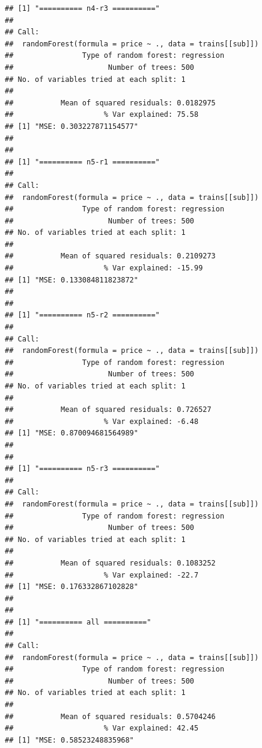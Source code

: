 \documentclass[
]{article}
\newenvironment{Shaded}{\begin{snugshade}}{\end{snugshade}}
\newcommand{\NormalTok}[1]{#1}
\newcommand{\OperatorTok}[1]{\textcolor[rgb]{0.81,0.36,0.00}{\textbf{#1}}}
\newcommand{\StringTok}[1]{\textcolor[rgb]{0.31,0.60,0.02}{#1}}
\begin{document}
\begin{verbatim}
## [1] "========== n4-r3 =========="
## 
## Call:
##  randomForest(formula = price ~ ., data = trains[[sub]]) 
##                Type of random forest: regression
##                      Number of trees: 500
## No. of variables tried at each split: 1
## 
##           Mean of squared residuals: 0.0182975
##                     % Var explained: 75.58
## [1] "MSE: 0.303227871154577"
## 
## 
## [1] "========== n5-r1 =========="
## 
## Call:
##  randomForest(formula = price ~ ., data = trains[[sub]]) 
##                Type of random forest: regression
##                      Number of trees: 500
## No. of variables tried at each split: 1
## 
##           Mean of squared residuals: 0.2109273
##                     % Var explained: -15.99
## [1] "MSE: 0.133084811823872"
## 
## 
## [1] "========== n5-r2 =========="
## 
## Call:
##  randomForest(formula = price ~ ., data = trains[[sub]]) 
##                Type of random forest: regression
##                      Number of trees: 500
## No. of variables tried at each split: 1
## 
##           Mean of squared residuals: 0.726527
##                     % Var explained: -6.48
## [1] "MSE: 0.870094681564989"
## 
## 
## [1] "========== n5-r3 =========="
## 
## Call:
##  randomForest(formula = price ~ ., data = trains[[sub]]) 
##                Type of random forest: regression
##                      Number of trees: 500
## No. of variables tried at each split: 1
## 
##           Mean of squared residuals: 0.1083252
##                     % Var explained: -22.7
## [1] "MSE: 0.176332867102828"
## 
## 
## [1] "========== all =========="
## 
## Call:
##  randomForest(formula = price ~ ., data = trains[[sub]]) 
##                Type of random forest: regression
##                      Number of trees: 500
## No. of variables tried at each split: 1
## 
##           Mean of squared residuals: 0.5704246
##                     % Var explained: 42.45
## [1] "MSE: 0.58523248835968"
\end{verbatim}

\begin{Shaded}
\end{Shaded}

~\\
\end{document}

